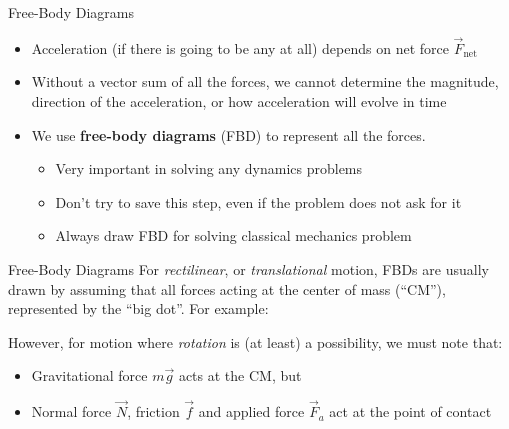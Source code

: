 \documentclass[12pt,compress,aspectratio=169]{beamer}
\begin{document}
\begin{frame}{Free-Body Diagrams}
  \begin{itemize}
  \item Acceleration (if there is going to be any at all) depends
    on net force $\vec F_\text{net}$
  \item Without a vector sum of all the forces, we cannot determine the
    magnitude, direction of the acceleration, or how acceleration will evolve
    in time
  \item We use \textbf{free-body diagrams} (FBD) to represent all the forces.
    \begin{itemize}
    \item Very important in solving any dynamics problems
    \item Don't try to save this step, even if the problem does not ask for it
    \item Always draw FBD for solving classical mechanics problem
    \end{itemize}
  \end{itemize}
\end{frame}



\begin{frame}{Free-Body Diagrams}
  For \emph{rectilinear}, or \emph{translational} motion, FBDs are usually drawn
  by assuming that all forces acting at the center of mass (``CM''),
  represented by the ``big dot''. For example:
  \begin{center}
  \end{center}
  However, for motion where \emph{rotation} is (at least) a possibility, we
  must note that:
  \begin{itemize}
  \item Gravitational force $m\vec g$ acts at the CM, but
  \item Normal force $\vec N$, friction $\vec f$ and applied force $\vec F_a$
    act at the point of contact
  \end{itemize}
\end{frame}
\end{document}
